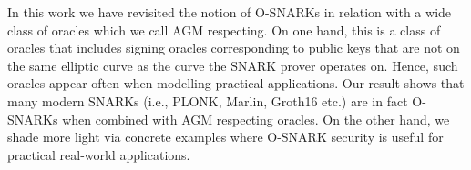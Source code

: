 In this work we have revisited the notion of O-SNARKs in relation with a wide class of oracles which we call AGM respecting. 
On one hand, this is a class of oracles that includes signing oracles corresponding to public keys that are not on the same 
elliptic curve as the curve the SNARK prover operates on. Hence, such oracles appear often when modelling practical applications. 
Our result shows that many modern SNARKs (i.e., PLONK, Marlin, Groth16 etc.) are in fact O-SNARKs when combined with AGM respecting oracles. 
On the other hand, we shade more light via concrete examples where O-SNARK security is useful for practical real-world applications. 

